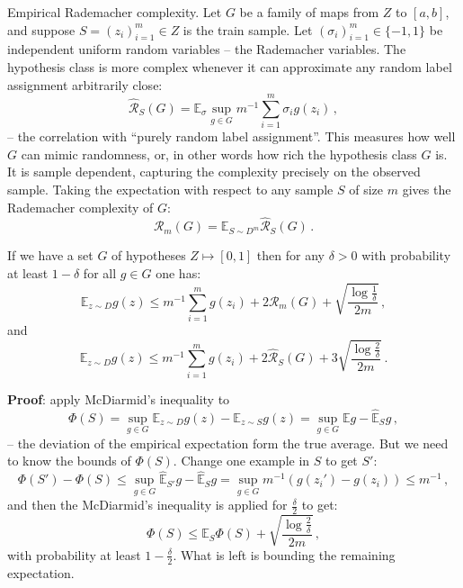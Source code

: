 \documentclass[a4paper]{article}
\newcommand{\ex}{\mathbb{E}}
\begin{document}
Empirical Rademacher complexity. Let $G$ be a family of maps from $Z$ to $[a, b]$,
and suppose $S = (z_i)_{i=1}^m \in Z$ is the train sample. Let $(\sigma_i)_{i=1}^m\in\{-1, 1\}$
be independent uniform random variables -- the Rademacher variables. The hypothesis
class is more complex whenever it can approximate any random label assignment arbitrarily
close:
\[ \hat{\mathcal{R}}_S(G)
    = \ex_{\sigma} \sup_{g\in G} m^{-1} \sum_{i=1}^m \sigma_i g(z_i)
    \,, \]
-- the correlation with ``purely random label assignment''. This measures how well
$G$ can mimic randomness, or, in other words how rich the hypothesis class $G$ is.
It is sample dependent, capturing the complexity precisely on the observed sample.
Taking the expectation with respect to any sample $S$ of size $m$ gives the Rademacher
complexity of $G$:
\[ \mathcal{R}_m(G) = \ex_{S\sim D^m} \hat{\mathcal{R}}_S(G) \,. \]

If we have a set $G$ of hypotheses $Z\mapsto [0,1]$ then for any $\delta>0$ with
probability at least $1-\delta$ for all $g\in G$ one has:
\[ \ex_{z\sim D} g(z)
    \leq m^{-1} \sum_{i=1}^m g(z_i) + 2\mathcal{R}_m(G)
    + \sqrt{\frac{\log\frac{1}{\delta}}{2m}}
    \,,\]
and
\[ \ex_{z\sim D} g(z)
    \leq m^{-1} \sum_{i=1}^m g(z_i) + 2\hat{\mathcal{R}}_S(G)
    + 3\sqrt{\frac{\log\frac{2}{\delta}}{2m}}
    \,.\]

\noindent \textbf{Proof}: apply McDiarmid's inequality to
\[\Phi(S)
    = \sup_{g\in G} \ex_{z\sim D} g(z) - \ex_{z\sim S} g(z)
    = \sup_{g\in G} \ex g - \hat{\ex}_S g
    \,, \]
-- the deviation of the empirical expectation form the true average. But we need
to know the bounds of $\Phi(S)$. Change one example in $S$ to get $S'$:
\[ \Phi(S') - \Phi(S)
    \leq \sup_{g\in G} \hat{\ex}_{S'} g  - \hat{\ex}_S g
    = \sup_{g\in G} m^{-1}(g(z_i') - g(z_i))
    \leq m^{-1} \,, \]
and then the McDiarmid's inequality is applied for $\frac{\delta}{2}$ to get:
\[ \Phi(S) \leq \ex_S \Phi(S) + \sqrt{\frac{\log\frac{2}{\delta}}{2m}} \,, \]
with probability at least $1-\frac{\delta}{2}$. What is left is bounding the remaining
expectation.
\end{document}
